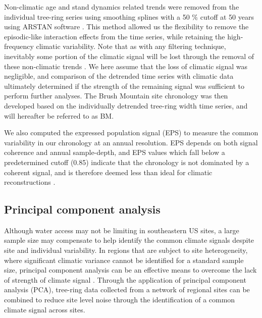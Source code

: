Non-climatic age and stand dynamics related trends were removed from
the individual tree-ring series using smoothing splines with a 50 \%
cutoff at 50 years using ARSTAN software \cite{cook1997calculating}. This
method allowed us the flexibility to remove the episodic-like interaction
effects from the time series, while retaining the high-frequency climatic
variability. Note that as with any filtering technique, inevitably some
portion of the climatic signal will be lost through the removal of these
non-climatic trends \cite{cook1981smoothing}. We here assume that the loss
of climatic signal was negligible, and comparison of the detrended time
series with climatic data ultimately determined if the strength of the
remaining signal was sufficient to perform further analyses. The Brush
Mountain site chronology was then developed based on the individually
detrended tree-ring width time series, and will hereafter be referred
to as BM. \label{sym:BM}


We also computed the expressed population signal (EPS)\label{sym:EPS}
to measure the common variability in our chronology at an annual
resolution. EPS depends on both signal coherence and annual sample-depth,
and EPS values which fall below a predetermined cutoff (0.85)
indicate that the chronology is not dominated by a coherent signal,
and is therefore deemed less than ideal for climatic reconstructions
\cite{wigley1984average}.


\subsection{Principal component analysis}

Although water access may not be limiting in southeastern US sites,
a large sample size may compensate to help identify the common climate
signals despite site and individual variability. In regions that are
subject to site heterogeneity, where significant climatic variance
cannot be identified for a standard sample size, principal component
analysis can be an effective means to overcome the lack of strength
of climate signal \cite{peters1981principal, anchukaitis2006forward,
jacoby1989reconstructed}. Through the application of principal component
analysis (PCA)\label{sym:PCA}, tree-ring data collected from a network
of regional sites can be combined to reduce site level noise through
the identification of a common climate signal across sites.

